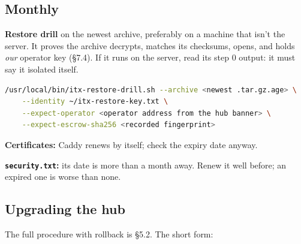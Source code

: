 \documentclass[11pt]{article}
\begin{document}
\subsection{Monthly}

\begin{checklist}
  \item \textbf{Restore drill} on the newest archive, preferably on a machine that isn't the server. It proves the archive decrypts, matches its checksums, opens, and holds \emph{our} operator key (\S7.4). If it runs on the server, read its step 0 output: it must say it isolated itself.
\begin{lstlisting}[language=bash]
/usr/local/bin/itx-restore-drill.sh --archive <newest .tar.gz.age> \
    --identity ~/itx-restore-key.txt \
    --expect-operator <operator address from the hub banner> \
    --expect-escrow-sha256 <recorded fingerprint>
\end{lstlisting}
  \item \textbf{Certificates:} Caddy renews by itself; check the expiry date anyway.
  \item \textbf{\texttt{security.txt}:} its  date is more than a month away. Renew it well before; an expired one is worse than none.
\end{checklist}

\subsection{Upgrading the hub}

The full procedure with rollback is \S5.2. The short form:
\end{document}

